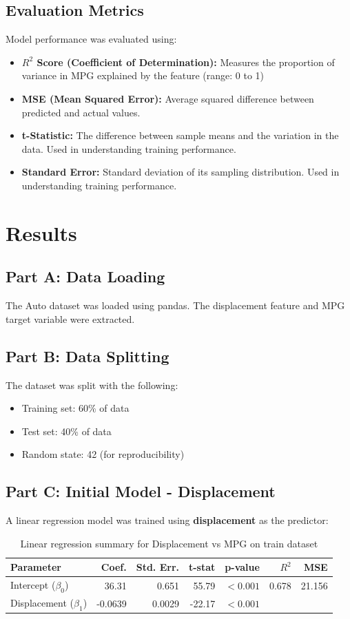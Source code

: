 \documentclass[12pt]{article}
\begin{document}
\subsection{Evaluation Metrics}
Model performance was evaluated using:
\begin{itemize}
    \item \textbf{$R^2$ Score (Coefficient of Determination):} Measures the proportion of variance in MPG explained by the feature (range: 0 to 1)
    \item \textbf{MSE (Mean Squared Error):} Average squared difference between predicted and actual values.
    \item \textbf{t-Statistic:} The difference between sample means and the variation in the data. Used in understanding training performance.
    \item \textbf{Standard Error:} Standard deviation of its sampling distribution. Used in understanding training performance.
\end{itemize}

\section{Results}

\subsection{Part A: Data Loading}
The Auto dataset was loaded using pandas. The displacement feature and MPG target variable were extracted.

\subsection{Part B: Data Splitting}
The dataset was split with the following:
\begin{itemize}
    \item Training set: 60\% of data
    \item Test set: 40\% of data
    \item Random state: 42 (for reproducibility)
\end{itemize}

\subsection{Part C: Initial Model - Displacement}
A linear regression model was trained using \textbf{displacement} as the predictor:

\begin{table}[H]
\centering
\begin{tabular}{lrrrrrr}
\toprule
\textbf{Parameter} & \textbf{Coef.} & \textbf{Std. Err.} & \textbf{t-stat} & \textbf{p-value} & $R^2$ & MSE \\
\midrule
Intercept ($\beta_0$) & 36.31 & 0.651 & 55.79 & $<0.001$ & 0.678 & 21.156 \\
Displacement ($\beta_1$) & -0.0639 & 0.0029 & -22.17 & $<0.001$ &  &  \\
\bottomrule
\end{tabular}
\caption{Linear regression summary for Displacement vs MPG on train dataset}
\end{table}
\end{document}
